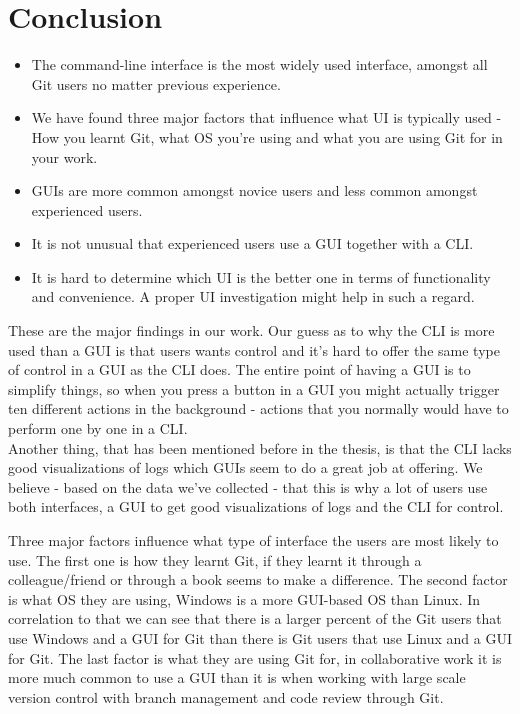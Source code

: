 \documentclass[a4paper,oneside]{bth} %
\begin{document}
		
		\chapter{Conclusion}
		\begin{itemize}
			\item The command-line interface is the most widely used interface, amongst all Git users no matter previous experience.
			\item We have found three major factors that influence what UI is typically used - How you learnt Git, what OS you're using and what you are using Git for in your work.
			\item GUIs are more common amongst novice users and less common amongst experienced users.
			\item It is not unusual that experienced users use a GUI together with a CLI.
			\item It is hard to determine which UI is the better one in terms of functionality and convenience. A proper UI investigation might help in such a regard.
		\end{itemize}
		
		These are the major findings in our work.
		Our guess as to why the CLI is more used than a GUI is that users wants control and it's hard to offer the same type of control in a GUI as the CLI does.
		The entire point of having a GUI is to simplify things, so when you press a button in a GUI you might actually trigger ten different actions in the background - actions that you normally would have to perform one by one in a CLI.\\
		Another thing, that has been mentioned before in the thesis, is that the CLI lacks good visualizations of logs which GUIs seem to do a great job at offering.
		We believe - based on the data we've collected - that this is why a lot of users use both interfaces, a GUI to get good visualizations of logs and the CLI for control.
		
		Three major factors influence what type of interface the users are most likely to use. The first one is how they learnt Git, if they learnt it through a colleague/friend or through a book seems to make a difference. The second factor is what OS they are using, Windows is a more GUI-based OS than Linux. In correlation to that we can see that there is a larger percent of the Git users that use Windows and a GUI for Git than there is Git users that use Linux and a GUI for Git.
		The last factor is what they are using Git for, in collaborative work it is more much common to use a GUI than it is when working with large scale version control with branch management and code review through Git.
		
\end{document}
